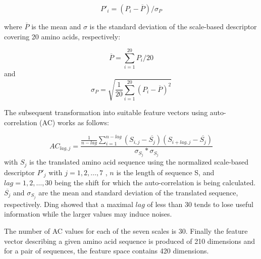 \documentclass[preprint,3p,times,twocolumn]{elsarticle}
\begin{document}
\begin{equation}
P'_{i} = (P_i - \overline{P}) / \sigma_P
\end{equation}

where $\overline{P}$ is the mean and $\sigma$ is the standard
deviation of the scale-based descriptor covering 20 amino acids,
respectively: 

\begin{equation}
\overline{P} = \sum^{20}_{i=1}P_i / 20
\end{equation}
 and 
\begin{equation}
\sigma_P = \sqrt{\frac{1}{20} \sum^{20}_{i=1}(P_i - \overline{P})^2}
\end{equation}

The subsequent transformation into suitable feature vectors using
auto-correlation (AC) works as follows: 

\begin{equation}
AC_{lag, j} = \frac {\frac{1}{n-lag} \sum^{n-lag}_{i=1} ( S_{i,j} - \overline{S_j}) (S_{i+lag,j} - \overline{S_j})} { \sigma_{S_j} * \sigma_{S_j} }
\end{equation}
with $S_j$ is the translated amino acid sequence using the normalized
scale-based descriptor $P'_j$ with $j = 1, 2, \dots, 7$ , $n$ is the
length of sequence S, and $lag = 1, 2, \dots, 30$  being the shift for
which the auto-correlation is being calculated. $\overline{S_j}$ and
$\sigma_{S_j}$ are the mean and standard deviation of the translated
sequence, respectively. Ding \cite{Ding:2016} showed that a maximal
$lag$ of less than 30 tends to lose useful information while the
larger values may induce noises. 

The number of AC values for each of the seven scales is 30. Finally
the feature vector describing a given amino acid sequence is produced
of 210 dimensions and for a pair of sequences, the feature space
contains 420 dimensions. 
\end{document}
